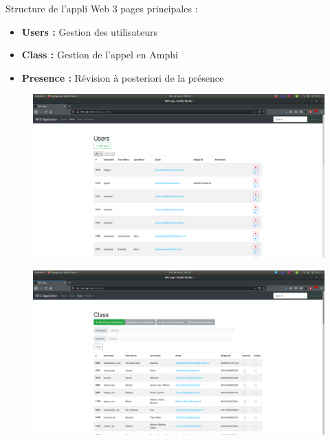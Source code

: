 \documentclass[aspectratio=169]{beamer}
\begin{document}
\begin{frame}{Structure de l'appli Web}
  3 pages principales :
  \begin{itemize}
    \item \textbf{Users :} Gestion des utilisateurs
    \item \textbf{Class :} Gestion de l'appel en Amphi
    \item \textbf{Presence :} Révision à posteriori de la présence
  \end{itemize}
\end{frame}

\begin{frame}
  \begin{figure}
    \centering
    \includegraphics[height=.9\textheight]{../assets/capture_page_users.png}
  \end{figure}
\end{frame}

\begin{frame}
  \begin{figure}
    \centering
    \includegraphics[height=.9\textheight]{../assets/capture_page_class.png}
  \end{figure}
\end{frame}
\end{document}
